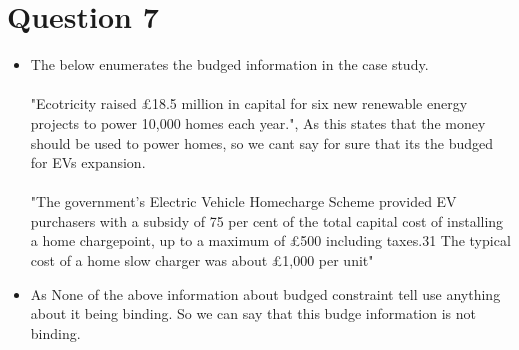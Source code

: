 \documentclass[12pt,letterpaper]{article}
\begin{document}
\section*{Question 7}
\begin{itemize}
    \item The below enumerates the budged information in the case study. \\
          \\
          "Ecotricity  raised  £18.5  million  in  capital  for  six  new  renewable energy projects to power 10,000 homes each year.", As this states that the money should be used to power homes, so we cant say for sure that its the budged for EVs expansion. \\
          \\
          "The government’s Electric Vehicle Homecharge Scheme provided EV purchasers with a subsidy of 75 per cent of the total capital cost of installing a home chargepoint, up to a maximum of £500 including taxes.31 The typical cost of a home slow charger was about £1,000 per unit"
          
    \item As None of the above information about budged constraint tell use anything about it being binding. So we can say that this budge information is not binding.
\end{itemize}
\end{document}
